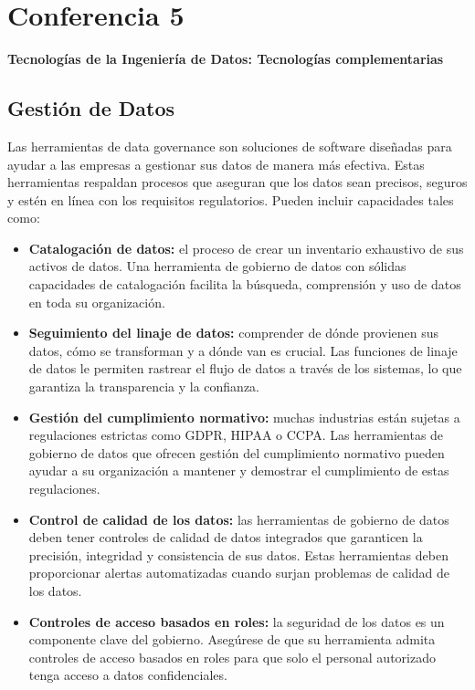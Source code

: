 \documentclass[12pt]{book}
\begin{document}
\chapter{Conferencia 5}
\normalfont\LARGE \textbf{Tecnologías de la Ingeniería de Datos: Tecnologías complementarias}
\normalfont\small\\

\section{Gestión de Datos}

Las herramientas de data governance son soluciones de software diseñadas para ayudar a las empresas a gestionar sus datos de manera más efectiva. Estas herramientas respaldan procesos que aseguran que los datos sean precisos, seguros y estén en línea con los requisitos regulatorios. Pueden incluir capacidades tales como:

\begin{itemize}
    \item \textbf{Catalogación de datos:} el proceso de crear un inventario exhaustivo de sus activos de datos. Una herramienta de gobierno de datos con sólidas capacidades de catalogación facilita la búsqueda, comprensión y uso de datos en toda su organización.
    \item \textbf{Seguimiento del linaje de datos:} comprender de dónde provienen sus datos, cómo se transforman y a dónde van es crucial. Las funciones de linaje de datos le permiten rastrear el flujo de datos a través de los sistemas, lo que garantiza la transparencia y la confianza.
    \item \textbf{Gestión del cumplimiento normativo:} muchas industrias están sujetas a regulaciones estrictas como GDPR, HIPAA o CCPA. Las herramientas de gobierno de datos que ofrecen gestión del cumplimiento normativo pueden ayudar a su organización a mantener y demostrar el cumplimiento de estas regulaciones.
    \item \textbf{Control de calidad de los datos:} las herramientas de gobierno de datos deben tener controles de calidad de datos integrados que garanticen la precisión, integridad y consistencia de sus datos. Estas herramientas deben proporcionar alertas automatizadas cuando surjan problemas de calidad de los datos.
    \item \textbf{Controles de acceso basados en roles:} la seguridad de los datos es un componente clave del gobierno. Asegúrese de que su herramienta admita controles de acceso basados en roles para que solo el personal autorizado tenga acceso a datos confidenciales.
\end{itemize}
\end{document}
